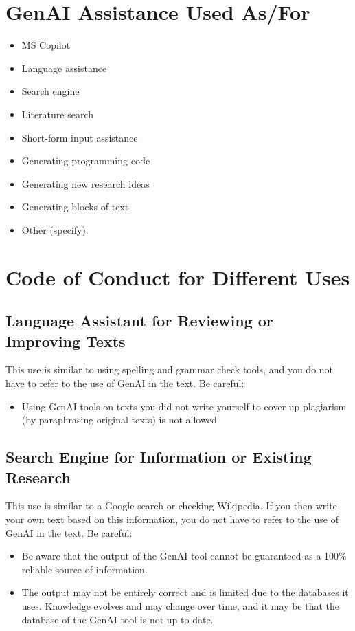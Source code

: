 \section*{GenAI Assistance Used As/For}
\begin{itemize}
    \item[$\Box$] MS Copilot \\
    \item[\(\boxtimes\)] Language assistance \\
    \item[$\Box$] Search engine \\
    \item[$\Box$] Literature search \\
    \item[$\Box$] Short-form input assistance \\
    \item[$\Box$] Generating programming code \\
    \item[$\Box$] Generating new research ideas \\
    \item[$\Box$] Generating blocks of text \\
    \item[$\Box$] Other (specify): \underline{\hspace{5cm}}
\end{itemize}

\section*{Code of Conduct for Different Uses}
\subsection*{Language Assistant for Reviewing or Improving Texts}
This use is similar to using spelling and grammar check tools, and you do not have to refer to the use of GenAI in the text. Be careful:
\begin{itemize}
    \item Using GenAI tools on texts you did not write yourself to cover up plagiarism (by paraphrasing original texts) is not allowed.
\end{itemize}

\subsection*{Search Engine for Information or Existing Research}
This use is similar to a Google search or checking Wikipedia. If you then write your own text based on this information, you do not have to refer to the use of GenAI in the text. Be careful:
\begin{itemize}
    \item Be aware that the output of the GenAI tool cannot be guaranteed as a 100\% reliable source of information.
    \item The output may not be entirely correct and is limited due to the databases it uses. Knowledge evolves and may change over time, and it may be that the database of the GenAI tool is not up to date.
\end{itemize}

